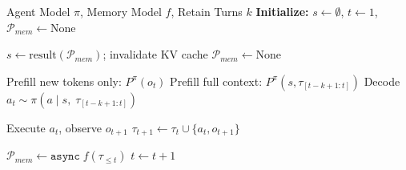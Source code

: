 \begin{algorithm}[t]
\caption{$k$-step-off Pipeline}
\label{alg:k_step_pipeline}
\small
\begin{algorithmic}[1]
\REQUIRE Agent Model $\pi$, Memory Model $f$, Retain Turns $k$
\STATE \textbf{Initialize:} $s \leftarrow \emptyset$, $t \leftarrow 1$, $\mathcal{P}_{mem} \leftarrow \text{None}$

    \STATE {}
        \STATE $s \leftarrow \text{result}(\mathcal{P}_{mem})$; \; invalidate KV cache
        \STATE $\mathcal{P}_{mem} \leftarrow \text{None}$
    \ENDIF
    
    \STATE {}
        \STATE Prefill new tokens only: $P^\pi(o_t)$ 
    \ELSE
        \STATE Prefill full context: $P^\pi(s, \tau_{[t-k+1:t]})$ 
    \ENDIF
    \STATE Decode $a_t \sim \pi(a \mid s,\; \tau_{[t-k+1:t]})$
    
    \STATE {}
    \STATE Execute $a_t$, observe $o_{t+1}$
    \STATE $\tau_{t+1} \leftarrow \tau_t \cup \{a_t, o_{t+1}\}$
    
    \STATE {}
        \STATE $\mathcal{P}_{mem} \leftarrow \texttt{async}\; f(\tau_{\leq t})$
    \ENDIF
    \STATE $t \leftarrow t + 1$
\ENDWHILE
\end{algorithmic}
\end{algorithm}
